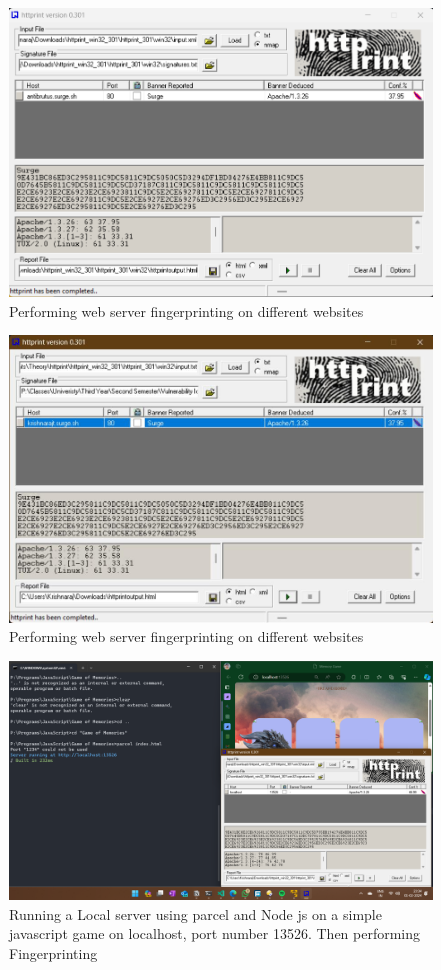 \documentclass[11pt]{article}
\begin{document}
\begin{figure}[H]
    \centering
    \includegraphics[height=0.5\textwidth]{httprint/httprint on antibrutus 2.png}
    \caption{Performing web server fingerprinting on different websites}
\end{figure}

\begin{figure}[H]
    \centering
    \includegraphics[height=0.5\textwidth]{httprint/httprint on krishnaraj surge.jpg}
    \caption{Performing web server fingerprinting on different websites}
\end{figure}

\begin{figure}[H]
    \centering
    \includegraphics[width=1\textwidth]{httprint/httprint on local server.png}
    \caption{Running a Local server using parcel and Node js on a simple javascript game on localhost, port number 13526. Then performing Fingerprinting}
\end{figure}
\end{document}
